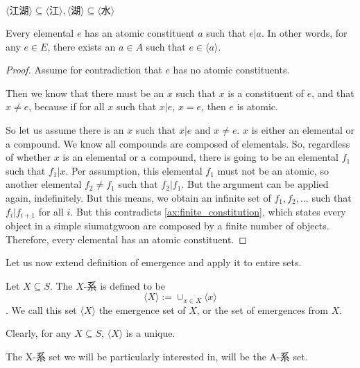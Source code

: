 $\langle \text{江湖} \rangle \subseteq \langle \text{江} \rangle,  \langle \text{湖} \rangle \subseteq \langle \text{水} \rangle$

\begin{lemma}\label{lem:every-elemental-has-an-atomic-constituent}
    Every elemental $e$ has an atomic constituent $a$ such that $e|a$. In other words, for any $e \in E$, there exists an $a \in A$ such that $e \in \langle a \rangle$.
\end{lemma}
\begin{proof}
    Assume for contradiction that $e$ has no atomic constituents. 

    Then we know that there must be an $x$ such that $x$ is a constituent of $e$, and that $x\neq e$, because if for all $x$ such that $x|e$, $x=e$, then $e$ is atomic. 

    So let us assume there is an $x$ such that $x|e$ and $x\neq e$. $x$ is either an elemental or a compound. We know all compounds are composed of elementals. So, regardless of whether $x$ is an elemental or a compound, there is going to be an elemental $f_1$ such that $f_1|x$. Per assumption, this elemental $f_1$ must not be an atomic, so another elemental $f_2\neq f_1$ such that $f_2|f_1$. But the argument can be applied again, indefinitely. But this means, we obtain an infinite set of $f_1, f_2, \ldots$ such that $f_i|f_{i+1}$ for all $i$. But this contradicts \ref{ax:finite_constitution}, which states every object in a simple siumatgwoon are composed by a finite number of objects. Therefore, every elemental has an atomic constituent.
\end{proof}








Let us now extend definition of emergence and apply it to entire sets. 
    
\begin{definition}[X-系]\label{def:hais-of-sets}
        Let $X\subseteq S$. The $X$-系 is defined to be $$\langle X \rangle := \cup_{x\in X} \langle x \rangle$$. We call this set  $\langle X \rangle$ the emergence set of $X$, or the set of emergences from $X$.
\end{definition}

Clearly, for any $X\subseteq S$, $\langle X \rangle$ is a unique.

The X-系 set we will be particularly interested in, will be the A-系 set. 

